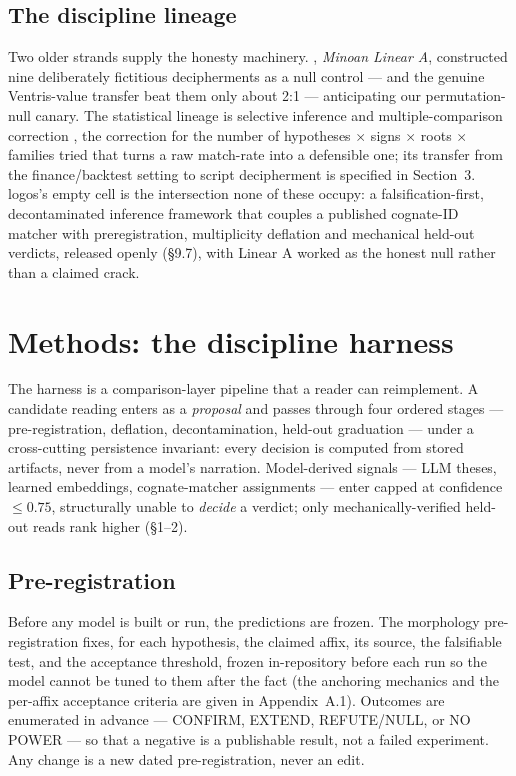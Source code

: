 \subsection{The discipline lineage}

Two older strands supply the honesty machinery. \citet{packard1974},
\emph{Minoan Linear A}, constructed nine deliberately fictitious
decipherments as a null control --- and the genuine Ventris-value transfer
beat them only about 2:1 --- anticipating our permutation-null canary. The
statistical lineage is selective inference and multiple-comparison
correction \citep{bailey2014}, the correction for the number of
hypotheses $\times$ signs $\times$ roots $\times$ families tried that
turns a raw match-rate into a defensible one; its transfer from the
finance/backtest setting to script decipherment is specified in
Section~3. logos's empty cell is the intersection none of these occupy: a
falsification-first, decontaminated inference framework that couples a
published cognate-ID matcher \citep[reporting the Luo 2019
metric]{tamburini2025} with preregistration, multiplicity deflation and
mechanical held-out verdicts, released openly (\S9.7), with Linear A
worked as the honest null rather than a claimed crack.

\section{Methods: the discipline harness}

The harness is a comparison-layer pipeline that a reader can reimplement.
A candidate reading enters as a \emph{proposal} and passes through four
ordered stages --- pre-registration, deflation, decontamination, held-out
graduation --- under a cross-cutting persistence invariant: every decision
is computed from stored artifacts, never from a model's narration. Model-derived signals --- LLM theses, learned embeddings,
cognate-matcher assignments --- enter capped at confidence $\le 0.75$,
structurally unable to \emph{decide} a verdict; only
mechanically-verified held-out reads rank higher (\S1--2).

\subsection{Pre-registration}

Before any model is built or run, the predictions are frozen. The
morphology pre-registration fixes, for each hypothesis, the claimed affix,
its source, the falsifiable test, and the acceptance threshold, frozen
in-repository before each run so the model cannot be tuned to them after
the fact (the anchoring mechanics and the per-affix acceptance criteria
are given in Appendix~A.1). Outcomes are enumerated in advance --- CONFIRM, EXTEND,
REFUTE/NULL, or NO POWER --- so that a negative is a publishable result,
not a failed experiment. Any change is a new dated pre-registration,
never an edit.

